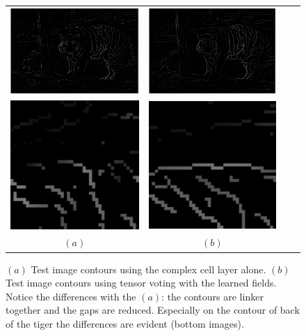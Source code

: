 \documentclass{llncs}
\begin{document}
\begin{figure}[t]
	\begin{center}
		\begin{tabular}{cccc}
			\includegraphics[width=0.4\linewidth]{./figs/af/im_oe} &
			\includegraphics[width=0.4\linewidth]{./figs/af/im_pg} \\
			\includegraphics[width=0.19\linewidth]{./figs/af/zoom_oe} &
			\includegraphics[width=0.19\linewidth]{./figs/af/zoom_pg} \\
			$(a)$ & $(b)$
		\end{tabular}
    \caption{$(a)$ Test image contours using the complex cell layer alone.
     $(b)$ Test image contours using tensor voting with the learned fields.
     Notice the differences with the $(a)$: the contours are
     linker together and the gaps are reduced. Especially on the contour of back of
     the tiger the differences are evident (bottom images).}
	   \label{fig:im_oe_pg}
	\end{center}
\end{figure}
\end{document}
